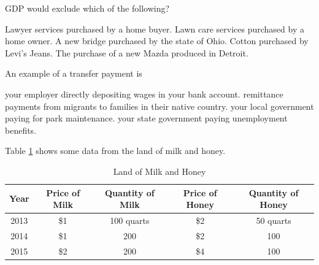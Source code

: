 \documentclass[addpoints,11pt]{exam}
\theoremstyle{definition}
\begin{document}
\begin{questions}
\question GDP would exclude which of the following?

\begin{choices}
	\choice Lawyer services purchased by a home buyer.
	\choice Lawn care services purchased by a home owner.
	\choice A new bridge purchased by the state of Ohio.
	\CorrectChoice Cotton purchased by Levi's Jeans.
	\choice The purchase of a new Mazda produced in Detroit.
\end{choices}

\question An example of a transfer payment is 

\begin{choices}
	\choice your employer directly depositing wages in your bank account.
	\choice remittance payments from migrants to families in their native country.
	\choice your local government paying for park maintenance.
	\CorrectChoice your state government paying unemployment benefits.
\end{choices}
			
		\question Table \ref{tab1} shows some data from the land of milk and honey. 
		
		\begin{table}[H]
			\centering
			\caption{Land of Milk and Honey}
			\label{tab1}
			\begin{tabular}{  c| c | c | c |c}        
				
				Year & Price of Milk & Quantity of Milk & Price of Honey & Quantity of Honey   \\
				\hline
				2013 & \$1 & 100 quarts & \$2 & 50 quarts \\
				2014 & \$1 & 200 & \$2 & 100 \\
				2015 & \$2 & 200 & \$4 & 100 \\
			\end{tabular}
		\end{table} 
		
\end{questions}
\end{document}

